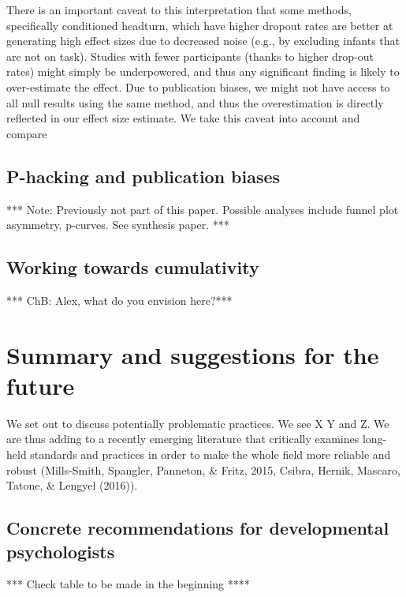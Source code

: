 \documentclass[english,floatsintext,man]{apa6}
\begin{document}
There is an important caveat to this interpretation that some methods,
specifically conditioned headturn, which have higher dropout rates are
better at generating high effect sizes due to decreased noise (e.g., by
excluding infants that are not on task). Studies with fewer participants
(thanks to higher drop-out rates) might simply be underpowered, and thus
any significant finding is likely to over-estimate the effect. Due to
publication biases, we might not have access to all null results using
the same method, and thus the overestimation is directly reflected in
our effect size estimate. We take this caveat into account and compare

\subsection{P-hacking and publication
biases}\label{p-hacking-and-publication-biases}

*** Note: Previously not part of this paper. Possible analyses include
funnel plot asymmetry, p-curves. See synthesis paper. ***

\subsection{Working towards
cumulativity}\label{working-towards-cumulativity}

*** ChB: Alex, what do you envision here?***

\section{Summary and suggestions for the
future}\label{summary-and-suggestions-for-the-future}

We set out to discuss potentially problematic practices. We see X Y and
Z. We are thus adding to a recently emerging literature that critically
examines long-held standards and practices in order to make the whole
field more reliable and robust (Mills-Smith, Spangler, Panneton, \&
Fritz, 2015, Csibra, Hernik, Mascaro, Tatone, \& Lengyel (2016)).

\subsection{Concrete recommendations for developmental
psychologists}\label{concrete-recommendations-for-developmental-psychologists}

*** Check table to be made in the beginning ****
\end{document}
